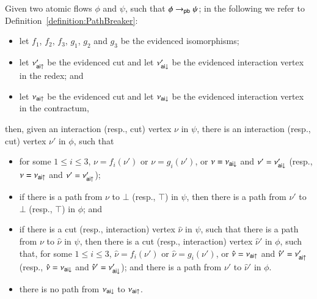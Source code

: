 \begin{lemma}\label{lemma:PathBreaker}
Given two atomic flows $\phi$ and $\psi$, such that $\phi\to_{\mathsf{pb}}\psi$; in the following we refer to Definition~\ref{definition:PathBreaker}:
\begin{itemize}
\item let $f_1$, $f_2$, $f_3$, $g_1$, $g_2$ and $g_3$ be the evidenced isomorphisms;
\item let $\nu'_{\mathsf{ai}{\uparrow}}$ be the evidenced cut and let $\nu'_{\mathsf{ai}{\downarrow}}$ be the evidenced interaction vertex in the redex; and
\item let $\nu_{\mathsf{ai}{\uparrow}}$ be the evidenced cut and let $\nu_{\mathsf{ai}{\downarrow}}$ be the evidenced interaction vertex in the contractum,
\end{itemize}
then, given an interaction (resp., cut) vertex $\nu$ in $\psi$, there is an interaction (resp., cut) vertex $\nu'$ in $\phi$, such that
\begin{itemize}
\item for some $1\le i\le 3$, $\nu=f_i(\nu')$ or $\nu=g_i(\nu')$, or $\nu=\nu_{\mathsf{ai}{\downarrow}}$ and $\nu'=\nu'_{\mathsf{ai}{\downarrow}}$ (resp., $\nu=\nu_{\mathsf{ai}{\uparrow}}$ and $\nu'=\nu'_{\mathsf{ai}{\uparrow}}$);
\item if there is a path from $\nu$ to $\bot$ (resp., $\top$) in $\psi$, then there is a path from $\nu'$ to $\bot$ (resp., $\top$) in $\phi$; and
\item if there is a cut (resp., interaction) vertex $\hat\nu$ in $\psi$, such that there is a path from $\nu$ to $\hat\nu$ in $\psi$, then there is a cut (resp., interaction) vertex $\hat\nu'$ in $\phi$, such that, for some $1\le i\le 3$, $\hat\nu=f_i(\nu')$ or $\hat\nu=g_i(\nu')$, or $\hat\nu=\nu_{\mathsf{ai}{\uparrow}}$ and $\hat\nu'=\nu'_{\mathsf{ai}{\uparrow}}$ (resp., $\hat\nu=\nu_{\mathsf{ai}{\downarrow}}$ and $\hat\nu'=\nu'_{\mathsf{ai}{\downarrow}}$); and there is a path from $\nu'$ to $\hat\nu'$ in $\phi$.
\item there is no path from $\nu_{\mathsf{ai}{\downarrow}}$ to $\nu_{\mathsf{ai}{\uparrow}}$.
\end{itemize}
\end{lemma}

